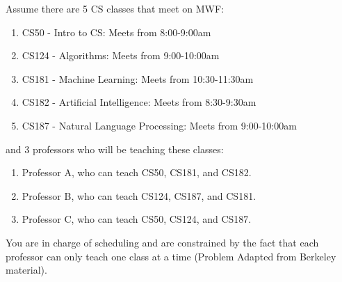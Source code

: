 \documentclass[a4paper]{article}
\begin{document}
Assume there are 5 CS classes that meet on MWF:
\begin{enumerate}
\item CS50 - Intro to CS: Meets from 8:00-9:00am
\item CS124 - Algorithms: Meets from 9:00-10:00am
\item CS181 - Machine Learning: Meets from 10:30-11:30am
\item CS182 - Artificial Intelligence: Meets from 8:30-9:30am
\item CS187 - Natural Language Processing: Meets from 9:00-10:00am
\end{enumerate}
and 3 professors who will be teaching these classes:
\begin{enumerate}
\item Professor A, who can teach CS50, CS181, and CS182.
\item Professor B, who can teach CS124, CS187, and CS181.
\item Professor C, who can teach CS50, CS124, and CS187. 
\end{enumerate}
You are in charge of scheduling and are constrained by the fact that each professor can only teach one class at a time (Problem Adapted from Berkeley material).
\end{document}
